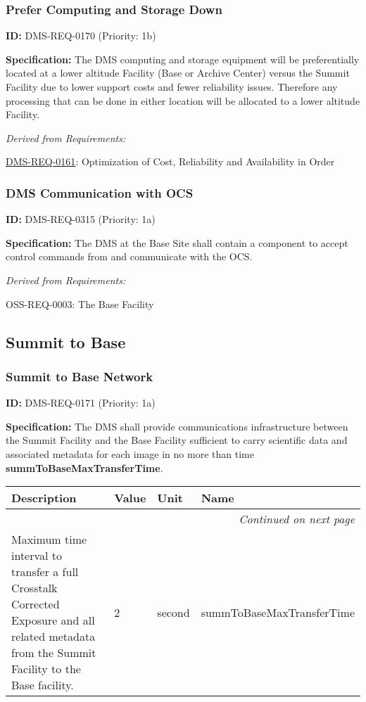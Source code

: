 \documentclass[SE,toc,lsstdraft]{lsstdoc}
\makeatletter
\newcommand{\paramname}[1]{\hspace{0pt}#1}
\newcommand{\unitname}[1]{\hspace{0pt}#1}
\newenvironment{parameters}[0]{%
\setlength\LTleft{0pt}
\setlength\LTright{\fill}
\begin{small}
\begin{longtable}[]{|p{0.49\textwidth}|l|p{0.6in}|p{1.70in}@{}|}

\hline \textbf{Description} & \textbf{Value} & \textbf{Unit} & \textbf{Name} \\ \hline
\endhead

\hline \multicolumn{4}{r}{\emph{Continued on next page}} \\
\endfoot

\hline\hline
\endlastfoot
}{%
\hline
\end{longtable}
\end{small}
}
\makeatother
\begin{document}
\subsubsection{Prefer Computing and Storage Down}

\label{DMS-REQ-0170}
\textbf{ID:} DMS-REQ-0170 (Priority: 1b)

\textbf{Specification: }The DMS computing and storage equipment will be preferentially located at a lower altitude Facility (Base or Archive Center) versus the Summit Facility due to lower support costs and fewer reliability issues. Therefore any processing that can be done in either location will be allocated to a lower altitude Facility.

\emph{Derived from Requirements:}

\hyperref[DMS-REQ-0161]{DMS-REQ-0161}:
Optimization of Cost, Reliability and Availability in Order \newline

\subsubsection{DMS Communication with OCS}

\label{DMS-REQ-0315}
\textbf{ID:} DMS-REQ-0315 (Priority: 1a)

\textbf{Specification:} The DMS at the Base Site shall contain a component to accept control commands from and communicate with the OCS.

\emph{Derived from Requirements:}

OSS-REQ-0003:
The Base Facility \newline

\subsection{Summit to Base}

\subsubsection{Summit to Base Network}

\label{DMS-REQ-0171}
\textbf{ID:} DMS-REQ-0171 (Priority: 1a)

\textbf{Specification:} The DMS shall provide communications infrastructure between the Summit Facility and the Base Facility sufficient to carry scientific data and associated metadata for each image in no more than time \textbf{summToBaseMaxTransferTime}.

\begin{parameters}
Maximum time interval to transfer a full Crosstalk Corrected Exposure and all related metadata from the Summit Facility to the Base facility.
&
2
&
\unitname{%
second
}
&
\paramname{%
summToBaseMaxTransferTime
} \\\hline
\end{parameters}
\end{document}
